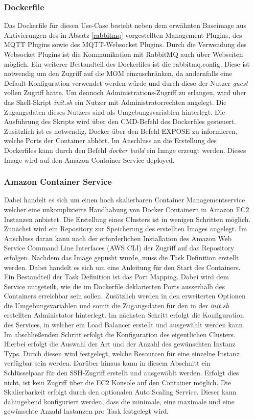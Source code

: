 \subsubsection{Dockerfile}
Das Dockerfile für diesen Use-Case besteht neben dem erwähnten Baseimage aus Aktivierungen des in Absatz \ref{rabbitmq} vorgestellten Management Plugins, des MQTT Plugins sowie des MQTT-Websocket Plugins. Durch die Verwendung des Websocket Plugins ist die Kommunikation mit RabbitMQ auch über Webseiten möglich. Ein weiterer Bestandteil des Dockerfiles ist die rabbitmq.config. Diese ist notwendig um den Zugriff auf die MOM einzuschränken, da andernfalls eine Default-Konfiguration verwendet werden würde und durch diese der Nutzer \emph{guest} vollen Zugriff hätte. Um dennoch Administrations-Zugriff zu erlangen, wird über das Shell-Skript \textit{init.sh} ein Nutzer mit Administratorrechten angelegt. Die Zugangsdaten dieses Nutzers sind als Umgebungsvariablen hinterlegt. Die Ausführung des Skripts wird über den CMD-Befehl des Dockerfiles gesteuert. Zusätzlich ist es notwendig, Docker über den Befehl EXPOSE zu informieren, welche Ports der Container abhört. Im Anschluss an die Erstellung des Dockerfiles kann durch den Befehl \emph{docker build} ein Image erzeugt werden. Dieses Image wird auf den Amazon Container Service deployed.
\subsubsection{Amazon Container Service}\label{acs}
Dabei handelt es sich um einen hoch skalierbaren Container Managementservice welcher eine unkomplizierte Handhabung von Docker Containern in Amazon EC2 Instanzen anbietet. Die Erstellung eines Clusters ist in wenigen Schritten möglich. Zunächst wird ein Repository zur Speicherung des erstellten Images angelegt. Im Anschluss daran kann nach der erforderlichen Installation des Amazon Web Service Command Line Interfaces (AWS CLI) der Zugriff auf das Repository erfolgen. Nachdem das Image gepusht wurde, muss die Task Definition erstellt werden. Dabei handelt es sich um eine Anleitung für den Start des Containers. Ein Bestandteil der Task Definition ist das Port Mapping. Dabei wird dem Service mitgeteilt, wie die im Dockerfile deklarierten Ports ausserhalb des Containers erreichbar sein sollen. Zusätzlich werden in den erweiterten Optionen die Umgebungsvariablen und somit die Zugangsdaten für den in der \emph{init.sh} erstellten Administator hinterlegt. Im nächsten Schritt erfolgt die Konfiguration des Services, in welcher ein Load Balancer erstellt und ausgewählt werden kann. Im abschließenden Schritt erfolgt die Konfiguration des eigentlichen Clusters. Hierbei erfolgt die Auswahl der Art und der Anzahl des gewünschten Instanz Typs. Durch diesen wird festgelegt, welche Resourcen für eine einzelne Instanz verfügbar sein werden. Darüber hinaus kann in diesem Abschnitt ein Schlüsselpaar für den SSH-Zugriff erstellt und ausgewählt werden. Erfolgt dies nicht, ist kein Zugriff über die EC2 Konsole auf den Container möglich. Die Skalierbarkeit erfolgt durch den optionalen Auto Scaling Service. Dieser kann dahingehend konfiguriert werden, dass die minimale, eine maximale und eine gewünschte Anzahl Instanzen pro Task festgelegt wird.

